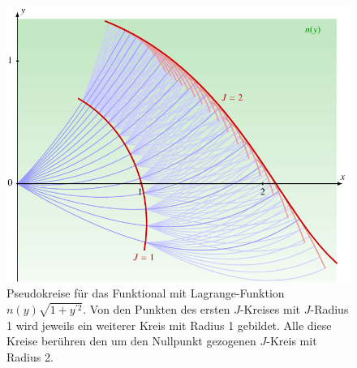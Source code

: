 %
%
%
\begin{figure}
\centering
\includegraphics{chapters/080-hamiltonjacobi/examples/kreis.pdf}
\caption{Pseudokreise für das Funktional mit Lagrange-Funktion
$n(y)\sqrt{1+y^{\prime 2}}$.
Von den Punkten des ersten $J$-Kreises mit $J$-Radius 1 wird
jeweils ein weiterer Kreis mit Radius 1 gebildet.
Alle diese Kreise berühren den um den Nullpunkt gezogenen $J$-Kreis mit
Radius 2.
\label{buch:hamiltonjacobi:hamiltonjacobi:kreis}}
\end{figure}

